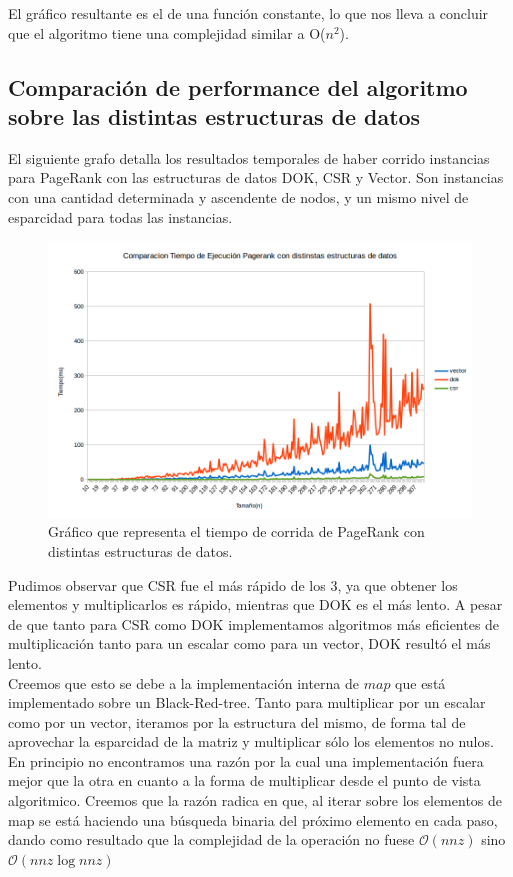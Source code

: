El gráfico resultante es el de una función constante, lo que nos lleva a concluir que el algoritmo tiene una complejidad similar a O($n^{2}$).

\subsection{Comparación de performance del algoritmo sobre las distintas estructuras de datos}

El siguiente grafo detalla los resultados temporales de haber corrido instancias para PageRank con las estructuras de datos DOK, CSR y Vector. Son instancias con una cantidad determinada y ascendente de nodos, y un mismo nivel de esparcidad para todas las instancias.

\begin{figure}[h]
  \includegraphics[scale=0.4]{imagenes/comparacion-tiempo-ejecucion-csr-dok-vector.png}
   \caption{Gráfico que representa el tiempo de corrida de PageRank con distintas estructuras de datos.}
  \label{fig:img1}
\end{figure}

Pudimos observar que CSR fue el más rápido de los 3, ya que obtener los elementos y multiplicarlos es rápido, mientras que DOK es el más lento. A pesar de que tanto para CSR como DOK implementamos algoritmos más eficientes de multiplicación tanto para un escalar como para un vector, DOK resultó el más lento. \\

Creemos que esto se debe a la implementación interna de $map$ que está implementado sobre un Black-Red-tree. Tanto para multiplicar por un escalar como por un vector, iteramos por la estructura del mismo, de forma tal de aprovechar la esparcidad de la matriz y multiplicar sólo los elementos no nulos. En principio no encontramos una razón por la cual una implementación fuera mejor que la otra en cuanto a la forma de multiplicar desde el punto de vista algoritmico. Creemos que la razón radica en que, al iterar sobre los elementos de map se está haciendo una búsqueda binaria del próximo elemento en cada paso, dando como resultado que la complejidad de la operación no fuese $\mathcal{O}(nnz)$ sino $\mathcal{O}(nnz\log{}nnz)$ \\

